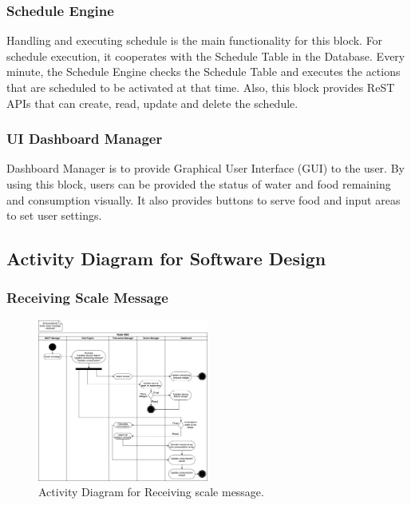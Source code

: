 \documentclass[conference]{IEEEtran}
\begin{document}
\subsubsection{Schedule Engine}
\hfill \break Handling and executing schedule is the main functionality for this block. For schedule execution, it cooperates with the Schedule Table in the Database. Every minute, the Schedule Engine checks the Schedule Table and executes the actions that are scheduled to be activated at that time. Also, this block provides ReST APIs that can create, read, update and delete the schedule.

\subsubsection{UI Dashboard Manager}
\hfill \break Dashboard Manager is to provide Graphical User Interface (GUI) to the user. By using this block, users can be provided the status of water and food remaining and consumption visually. It also provides buttons to serve food and input areas to set user settings.

\subsection{Activity Diagram for Software Design}
\subsubsection{Receiving Scale Message}
\begin{figure}[htbp]
\centerline{\includegraphics[width=0.5\textwidth]{./images/scaleMessageReceived.png}}
\caption{Activity Diagram for Receiving scale message.}
\label{fig}
\end{figure}
\end{document}
